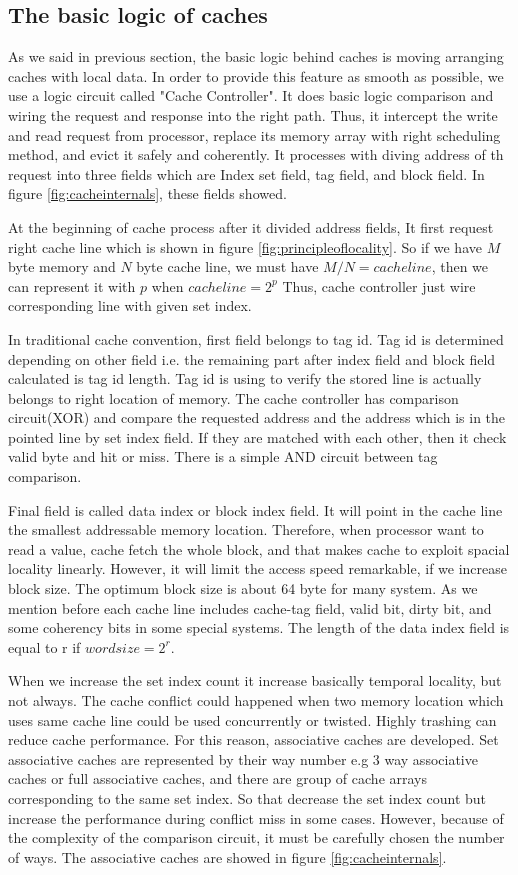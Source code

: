 \documentclass[informationsecurity]{gucmasterproject}
\begin{document}
\subsection{The basic logic of caches}
As we said in previous section, the basic logic behind caches is moving arranging caches with local data. In order to provide this feature as smooth as possible, we use a logic circuit called "Cache Controller". It does basic logic comparison and wiring the request and response into the right path. Thus, it intercept the write and read request from processor, replace its memory array with right scheduling method, and evict it safely and coherently. It processes with diving address of th request into three fields which are  Index set field, tag field, and block field. In figure \ref{fig:cacheinternals}, these fields showed. 

At the beginning of cache process after it divided address fields, It first request right cache line which is shown in figure \ref{fig:principleoflocality}. So if we have $M$ byte memory and $N$ byte cache line, we must have $M/N = cache line$, then we can represent it with $p$ when $cache line = 2^{p}$ Thus, cache controller just wire corresponding line with given set index. 

In traditional cache convention, first field belongs to tag id. Tag id is determined depending on other field i.e. the remaining part after index field and block field calculated is tag id length. Tag id is using to verify the stored line is actually belongs to right location of memory. The cache controller has comparison circuit(XOR) and compare the requested address and the address which is in the pointed line by set index field. If they are matched with each other, then it check valid byte and hit or miss. There is a simple AND circuit between tag comparison. 

Final field is called data index or block index field. It will point in the cache line the smallest addressable memory location. Therefore, when processor want to read a value, cache fetch the whole block, and that makes cache to exploit spacial locality linearly. However, it will limit the access speed remarkable, if we increase block size. The optimum block size is about 64 byte for many system. As we mention before each cache line includes cache-tag field, valid bit, dirty bit, and some coherency bits in some special systems. The length of the data index field is equal to r if  $ word size = 2^{r}  $.

When we increase the set index count it increase basically temporal locality, but not always. The cache conflict could happened when two memory location which uses same cache line could be used concurrently or twisted. Highly trashing can reduce cache performance. For this reason, associative caches are developed. Set associative caches are represented by their way number e.g 3 way associative caches or full associative caches, and there are group of cache arrays corresponding to the same set index. So that decrease the set index count but increase the performance during conflict miss in some cases. However, because of the complexity of the comparison circuit, it must be carefully chosen the number of ways. The associative caches are showed in figure \ref{fig:cacheinternals}. 
\end{document}
